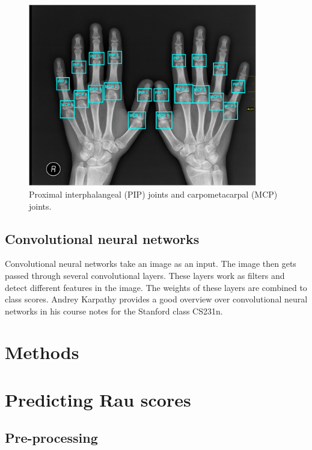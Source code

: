\documentclass[12pt]{article}
\begin{document}
\begin{figure}[ht]
\includegraphics[width=10cm]{joints}	
\caption{Proximal interphalangeal (PIP) joints and carpometacarpal  (MCP) joints.}
\label{fig:joints}
\end{figure}




\subsection{Convolutional neural networks}
\label{subsec:cnn}
Convolutional neural networks take an image as an input. The image then gets passed through several convolutional layers. These layers work as filters and detect different features in the image. The weights of these layers are combined to class scores. Andrey Karpathy provides a good overview over convolutional neural networks in his course notes for the Stanford class CS231n. \cite{cnn}



\section{Methods}
\label{sec:methods}


\section{Predicting Rau scores}

\subsection{Pre-processing}
\end{document}
